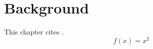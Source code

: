 \section{Background}
This chapter cites \cite{turing1950}.
\begin{equation}
f(x) = x^2 \label{eq:quad}
\end{equation}

